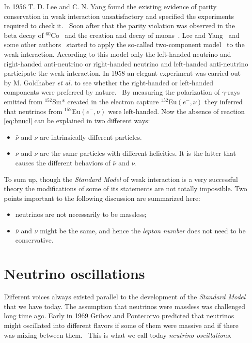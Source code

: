 In 1956 T. D. Lee and C. N. Yang found the existing evidence of parity conservation in weak interaction unsatisfactory and specified the experiments required to check it.~\cite{Lee56} Soon after that the parity violation was observed in the beta decay of $^{60}$Co~\cite{Wu57} and the creation and decay of muons~\cite{Gar57,Fri57}. Lee and Yang~\cite{Lee57} and some other authors~\cite{Sal57,Lan57} started to apply the so-called two-component model~\cite{Wey29} to the weak interaction. According to this model only the left-handed neutrino and right-handed anti-neutrino or right-handed neutrino and left-handed anti-neutrino participate the weak interaction. In 1958 an elegant experiment was carried out by M. Goldhaber \textit{et al.} to see whether the right-handed or left-handed components were preferred by nature.~\cite{Gol58} By measuring the polarization of $\gamma$-rays emitted from $^{152}$Sm* created in the electron capture $^{152}$Eu$(e^-,\nu)$ they inferred that neutrinos from $^{152}$Eu$(e^-,\nu)$ were left-handed. Now the absence of reaction \ref{eq:bnucl} can be explained in two different ways:
\begin{itemize}
\item $\bar{\nu}$ and $\nu$ are intrinsically different particles.
\item $\bar{\nu}$ and $\nu$ are the same particles with different
  helicities. It is the latter that causes the different behaviors of
  $\bar{\nu}$ and $\nu$.
\end{itemize}

To sum up, though the \emph{Standard Model} of weak interaction is a very successful theory the modifications of some of its statements are not totally impossible. Two points important to the following discussion are summarized here:
\begin{itemize}
\item neutrinos are not necessarily to be massless;
\item $\bar{\nu}$ and $\nu$ might be the same, and hence the
  \emph{lepton number} does not need to be conservative.
\end{itemize}


\section{Neutrino oscillations}
\label{sec:osci}
Different voices always existed parallel to the development of the \emph{Standard Model} that we have today. The assumption that neutrinos were massless was challenged long time ago. Early in 1969 Gribov and Pontecorvo predicted that neutrinos might oscillated into different flavors if some of them were massive and if there was mixing between them.~\cite{Gri69} This is what we call today \emph{neutrino oscillations}.


